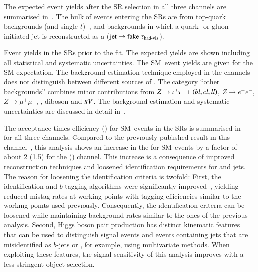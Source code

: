 The expected event yields after the SR selection in all three channels are
summarised in~. The bulk of events entering the SRs
are from top-quark backgrounds (\ttbar and single-$t$), \Zjets, and backgrounds
in which a quark- or gluon-initiated jet is reconstructed as a \tauhadvis
($\text{jet} \to \text{fake }\tau_{\text{had-vis}}$).


\begin{table}[htbp]
  \centering

  \caption[Event yields in the SRs prior to the fit.]{Event yields in the SRs
    prior to the fit. The expected yields are shown including all statistical
    and systematic uncertainties. The SM~\HH event yields are given for the SM
    expectation. The \faketauhadvisC background estimation technique employed in
    the \lephad channels does not distinguish between different sources of
    \faketauhadvis. The category ``other backgrounds'' combines minor
    contributions from $Z \to \tau^{+} \tau^{-} + (bl,cl,ll)$, $Z \to e^{+}e^{-}$,
    $Z \to \mu^{+}\mu^{-}$, \Wjets, diboson and $t\bar{t} V$. The background
    estimation and systematic uncertainties are discussed in detail
    in~.}%
  \label{tab:smhh_prefit_yields}%
  \label{tab:hadhad_presel_yields}

  \resizebox{\textwidth}{!}{
    
  }
\end{table}

The acceptance times efficiency (\AccTimesEff) for SM~\HH events in the SRs is
summarised in~ for all three channels. Compared
to the previously published result in this
channel~\cite{HIGG-2016-16-witherratum}, this analysis shows an increase in the
\AccTimesEff for SM~\HH events by a factor of about 2 (1.5) for the \hadhad
(\lephad) channel. This increase is a consequence of improved \tauhadvis
reconstruction techniques and loosened identification requirements for
\tauhadvis and \btagged jets.
The reason for loosening the identification criteria is twofold: First, the
\tauhadvis identification and $b$-tagging algorithms were significantly
improved~\cite{ATL-PHYS-PUB-2019-033,FTAG-2019-07}, yielding reduced mistag
rates at working points with tagging efficiencies similar to the working points
used previously. Consequently, the identification criteria can be loosened while
maintaining background rates similar to the ones of the previous analysis.
Second, Higgs boson pair production has distinct kinematic features that can be
used to distinguish signal events and events containing jets that are
misidentified as $b$-jets or \tauhadvis, for example, using multivariate
methods. When exploiting these features, the signal sensitivity of this analysis
improves with a less stringent object selection.

